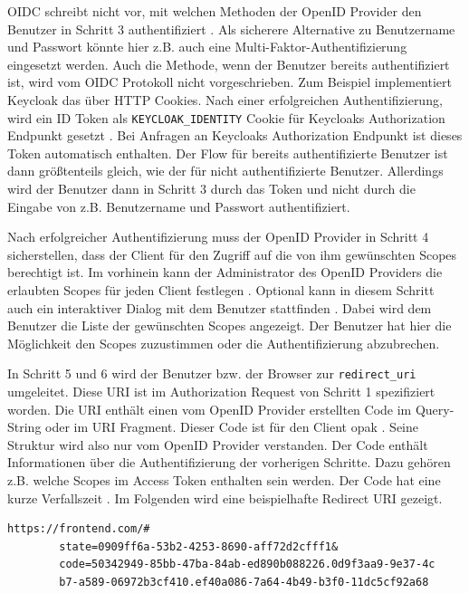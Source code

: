 OIDC schreibt nicht vor, mit welchen Methoden der OpenID Provider den Benutzer in Schritt 3 authentifiziert \cite[Authorization Server Authenticates End-User]{EB4}. Als sicherere Alternative zu Benutzername und Passwort könnte hier z.B. auch eine Multi-Faktor-Authentifizierung eingesetzt werden. Auch die Methode, wenn der Benutzer bereits authentifiziert ist, wird vom OIDC Protokoll nicht vorgeschrieben. Zum Beispiel implementiert Keycloak das über HTTP Cookies. Nach einer erfolgreichen Authentifizierung, wird ein ID Token als \texttt{KEYCLOAK\_IDENTITY} Cookie für Keycloaks Authorization Endpunkt gesetzt \cite{EB17}. Bei Anfragen an Keycloaks Authorization Endpunkt ist dieses Token automatisch enthalten. Der Flow für bereits authentifizierte Benutzer ist dann größtenteils gleich, wie der für nicht authentifizierte Benutzer. Allerdings wird der Benutzer dann in Schritt 3 durch das Token und nicht durch die Eingabe von z.B. Benutzername und Passwort authentifiziert.

Nach erfolgreicher Authentifizierung muss der OpenID Provider in Schritt 4 sicherstellen, dass der Client für den Zugriff auf die von ihm gewünschten Scopes berechtigt ist. Im vorhinein kann der Administrator des OpenID Providers die erlaubten Scopes für jeden Client festlegen \cite{EB68}. Optional kann in diesem Schritt auch ein interaktiver Dialog mit dem Benutzer stattfinden \cite[Authorization Server Obtains End-User Consent]{EB4}. Dabei wird dem Benutzer die Liste der gewünschten Scopes angezeigt. Der Benutzer hat hier die Möglichkeit den Scopes zuzustimmen oder die Authentifizierung abzubrechen.

In Schritt 5 und 6 wird der Benutzer bzw. der Browser zur \texttt{redirect\_uri} umgeleitet. Diese URI ist im Authorization Request von Schritt 1 spezifiziert worden. Die URI enthält einen vom OpenID Provider erstellten Code im Query-String oder im URI Fragment. Dieser Code ist für den Client opak \cite{EB67}. Seine Struktur wird also nur vom OpenID Provider verstanden. Der Code enthält Informationen über die Authentifizierung der vorherigen Schritte. Dazu gehören z.B. welche Scopes im Access Token enthalten sein werden. Der Code hat eine kurze Verfallszeit \cite[Authorization Code Flow]{keycloakDocs}. Im Folgenden wird eine beispielhafte Redirect URI gezeigt.

\begin{lstlisting}[caption=Beispiel Redirect URI, captionpos=b, label=EBBeispielRedirectURI]
https://frontend.com/#
        state=0909ff6a-53b2-4253-8690-aff72d2cfff1&
        code=50342949-85bb-47ba-84ab-ed890b088226.0d9f3aa9-9e37-4c
        b7-a589-06972b3cf410.ef40a086-7a64-4b49-b3f0-11dc5cf92a68
\end{lstlisting}

